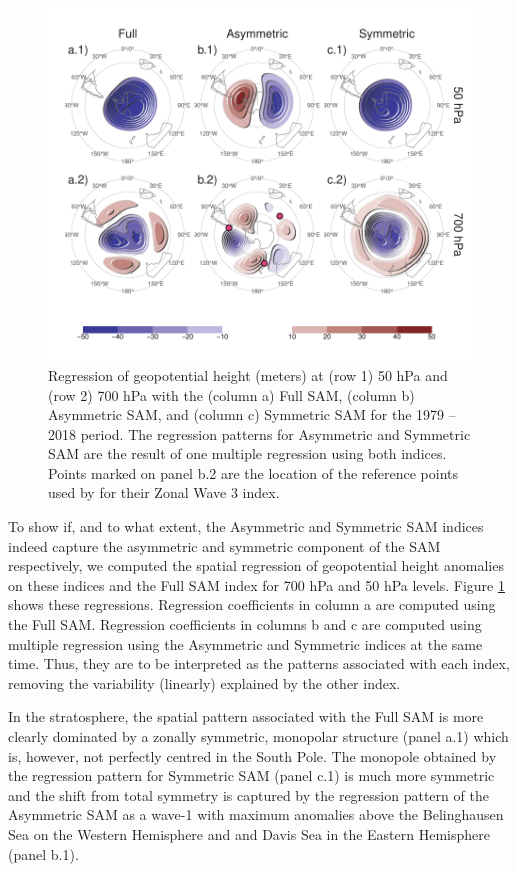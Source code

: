 \documentclass[smallextended]{svjour3}       %
\begin{document}
\begin{figure}
\includegraphics{2d-regr-1} \caption{Regression of geopotential height (meters) at (row 1) 50 hPa and (row 2) 700 hPa with the (column a) Full SAM, (column b) Asymmetric SAM, and (column c) Symmetric SAM for the 1979 -- 2018 period. The regression patterns for Asymmetric and Symmetric SAM are the result of one multiple regression using both indices. Points marked on panel b.2 are the location of the reference points used by \cite{raphael2004} for their Zonal Wave 3 index. }\label{fig:2d-regr}
\end{figure}

To show if, and to what extent, the Asymmetric and Symmetric SAM indices indeed capture the asymmetric and symmetric component of the SAM respectively, we computed the spatial regression of geopotential height anomalies on these indices and the Full SAM index for 700 hPa and 50 hPa levels. Figure \ref{fig:2d-regr} shows these regressions. Regression coefficients in column a are computed using the Full SAM. Regression coefficients in columns b and c are computed using multiple regression using the Asymmetric and Symmetric indices at the same time. Thus, they are to be interpreted as the patterns associated with each index, removing the variability (linearly) explained by the other index.

In the stratosphere, the spatial pattern associated with the Full SAM is more clearly dominated by a zonally symmetric, monopolar structure (panel a.1) which is, however, not perfectly centred in the South Pole. The monopole obtained by the regression pattern for Symmetric SAM (panel c.1) is much more symmetric and the shift from total symmetry is captured by the regression pattern of the Asymmetric SAM as a wave-1 with maximum anomalies above the Belinghausen Sea on the Western Hemisphere and and Davis Sea in the Eastern Hemisphere (panel b.1).
\end{document}
